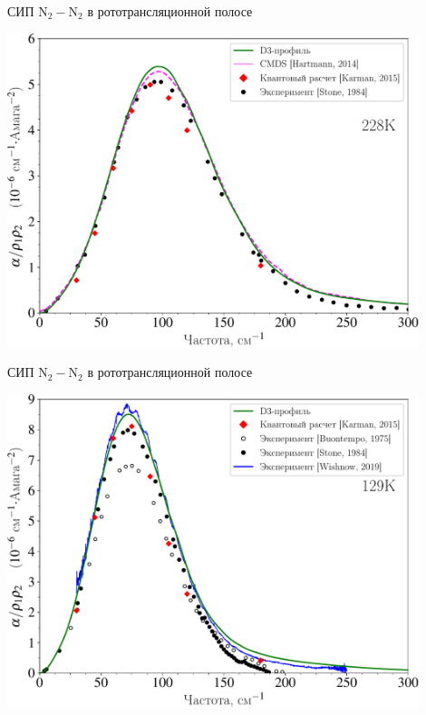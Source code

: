 \documentclass[10pt,usenames,pdf,hyperref={unicode},dvipsnames]{beamer}
\begin{document}
\begin{frame}{СИП N$_2-$N$_2$ в рототрансляционной полосе}
	\begin{center}
		\includegraphics[width=0.9\textwidth]{./pictures/228K_russian_legend-crop.pdf}
	\end{center}
\end{frame}

\begin{frame}{СИП N$_2-$N$_2$ в рототрансляционной полосе}
	\begin{center}
		\includegraphics[width=0.9\textwidth]{./pictures/129K_russian_legend-crop.pdf}
	\end{center}
\end{frame}
\end{document}
